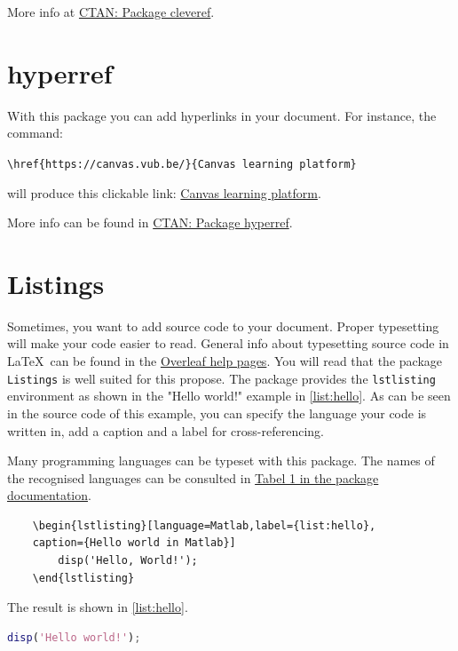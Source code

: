 More info at \href{https://ctan.org/pkg/cleveref}{CTAN: Package cleveref}.

\section{hyperref}\label{sec:hyperref}
With this package you can add hyperlinks in your document. For instance, the command:

\verb|\href{https://canvas.vub.be/}{Canvas learning platform}|

will produce this clickable link: \href{https://canvas.vub.be/}{Canvas learning platform}.

More info can be found in \href{https://ctan.org/pkg/hyperref}{CTAN: Package hyperref}.

\section{Listings}\label{sec:listing}
Sometimes, you want to add source code to your document. Proper typesetting will make your code easier to read. General info about typesetting source code in \LaTeX\ can be found in the \href{https://www.overleaf.com/learn/latex/Code_listing}{Overleaf help pages}. You will read that the package \texttt{Listings} is well suited for this propose. The package provides the \texttt{lstlisting} environment as shown in the "Hello world!" example in \cref{list:hello}. As can be seen in the source code of this example, you can specify the language your code is written in, add a caption and a label for cross-referencing.

Many programming languages can be typeset with this package. The names of the recognised languages can be consulted in \href{https://mirror.lyrahosting.com/CTAN/macros/latex/contrib/listings/listings.pdf}{Tabel 1 in the package documentation}. 

\begin{verbatim}
    \begin{lstlisting}[language=Matlab,label={list:hello},
    caption={Hello world in Matlab}]
        disp('Hello, World!');    
    \end{lstlisting}
\end{verbatim}

The result is shown in \cref{list:hello}.

\begin{lstlisting}[language=Matlab,label={list:hello},caption={Hello world in Matlab}]
    disp('Hello world!');  
\end{lstlisting}

